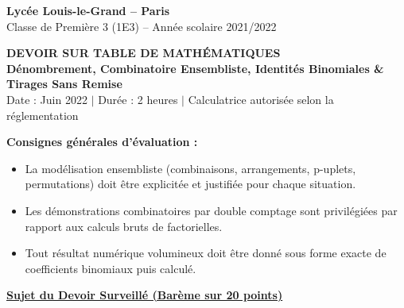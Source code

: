 \documentclass[11pt,a4paper]{article}
\begin{document}
\begin{center}
    {\LARGE \bfseries Lycée Louis-le-Grand -- Paris}\\[0.2cm]
    {\large Classe de Première 3 (1E3) -- Année scolaire 2021/2022}\\[0.3cm]
    \begin{tcolorbox}[colback=llglight,colframe=llgblue,arc=3mm,boxrule=1.2pt,center]
        \begin{center}
            {\Large \bfseries \color{llgblue} DEVOIR SUR TABLE DE MATHÉMATIQUES}\\[0.15cm]
            {\large \bfseries Dénombrement, Combinatoire Ensembliste, Identités Binomiales \& Tirages Sans Remise}\\[0.2cm]
            \small Date : Juin 2022 \quad $\vert$ \quad Durée : 2 heures \quad $\vert$ \quad Calculatrice autorisée selon la réglementation
        \end{center}
    \end{tcolorbox}
\end{center}

\vspace{0.3cm}

\begin{tcolorbox}[colback=white,colframe=llgblue!60,arc=1.5mm,boxrule=0.6pt]
\small\textbf{Consignes générales d'évaluation :}
\begin{itemize}[leftmargin=*,itemsep=1pt]
    \item La modélisation ensembliste (combinaisons, arrangements, p-uplets, permutations) doit être explicitée et justifiée pour chaque situation.
    \item Les démonstrations combinatoires par double comptage sont privilégiées par rapport aux calculs bruts de factorielles.
    \item Tout résultat numérique volumineux doit être donné sous forme exacte de coefficients binomiaux puis calculé.
\end{itemize}
\end{tcolorbox}

\vspace{0.4cm}

\begin{center}
    {\Large \bfseries \color{llgblue} \underline{Sujet du Devoir Surveillé (Barème sur 20 points)}}
\end{center}
\end{document}
